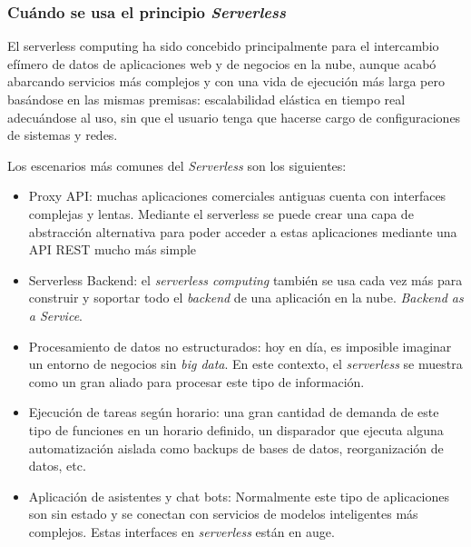 \subsubsection{Cuándo se usa el principio \emph{Serverless}}
El serverless computing ha sido concebido principalmente para el intercambio efímero de datos de aplicaciones web y de negocios en la nube, aunque acabó abarcando servicios más complejos y con una vida de ejecución más larga pero basándose en las mismas premisas: escalabilidad elástica en tiempo real adecuándose al uso, sin que el usuario tenga que hacerse cargo de configuraciones de sistemas y redes.
\par Los escenarios más comunes del \emph{Serverless} son los siguientes:
\begin{itemize}
    \item Proxy API: muchas aplicaciones comerciales antiguas cuenta con interfaces complejas y lentas. Mediante el serverless se puede crear una capa de abstracción alternativa para poder acceder a estas aplicaciones mediante una API REST mucho más simple
    \item Serverless Backend: el \emph{serverless computing} también se usa cada vez más para construir y soportar todo el \emph{backend} de una aplicación en la nube. \emph{Backend as a Service}.
    \item Procesamiento de datos no estructurados: hoy en día, es imposible imaginar un entorno de negocios sin \emph{big data}. En este contexto, el \emph{serverless} se muestra como un gran aliado para procesar este tipo de información.
    \item Ejecución de tareas según horario: una gran cantidad de demanda de este tipo de funciones en un horario definido, un disparador que ejecuta alguna automatización aislada como backups de bases de datos, reorganización de datos, etc.
    \item Aplicación de asistentes y chat bots: Normalmente este tipo de aplicaciones son sin estado y se conectan con servicios de modelos inteligentes más complejos. Estas interfaces en \emph{serverless} están en auge.
\end{itemize}
